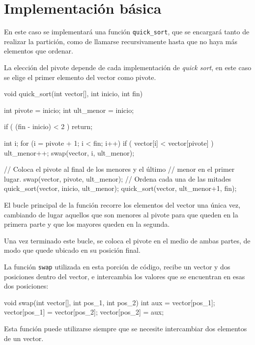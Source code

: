 \section{Implementación básica}

En este caso se implementará una función \lstinline!quick_sort!, que se
encargará tanto de realizar la partición, como de llamarse recursivamente
hasta que no haya más elementos que ordenar.

La elección del pivote depende de cada implementación de \textit{quick
sort}, en este caso se elige el primer elemento del vector como pivote.

\begin{codigo-c}
void quick_sort(int vector[], int inicio, int fin)
{
    int pivote = inicio;
    int ult_menor = inicio;

    if ( (fin - inicio) < 2 ) {
        return;
    }

    int i;
    for (i = pivote + 1; i < fin; i++) {
        if ( vector[i] < vector[pivote] ) {
            ult_menor++;
            swap(vector, i, ult_menor);
        }
    }

    // Coloca el pivote al final de los menores y el último
    // menor en el primer lugar.
    swap(vector, pivote, ult_menor);
    // Ordena cada una de las mitades
    quick_sort(vector, inicio, ult_menor);
    quick_sort(vector, ult_menor+1, fin);

}
\end{codigo-c}

El bucle principal de la función recorre los elementos del vector una única
vez, cambiando de lugar aquellos que son menores al pivote para que queden
en la primera parte y que los mayores queden en la segunda.

Una vez terminado este bucle, se coloca el pivote en el medio de ambas
partes, de modo que quede ubicado en su posición final.

La función \lstinline!swap! utilizada en esta porción de código, recibe un
vector y dos posiciones dentro del vector, e intercambia los valores que se
encuentran en esas dos posiciones:

\begin{codigo-c}
void swap(int vector[], int pos_1, int pos_2)
{
    int aux = vector[pos_1];
    vector[pos_1] = vector[pos_2];
    vector[pos_2] = aux;
}
\end{codigo-c}

Esta función puede utilizarse siempre que se necesite intercambiar dos
elementos de un vector.

